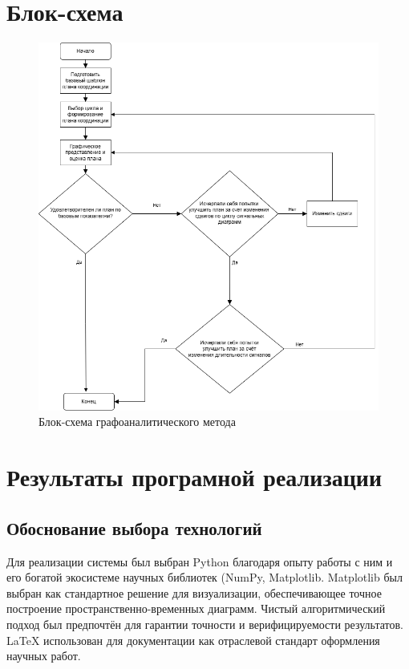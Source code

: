 \documentclass[12pt]{article}
\begin{document}
\section{Блок-схема}
\begin{figure}[h!]
  \centering
  \includegraphics[width=1.1\textwidth]{Block_diagram.png} 
  \caption{Блок-схема графоаналитического метода} 
  \label{fig:diagram} 
\end{figure}

\newpage

\section{Результаты програмной реализации}
\subsection{Обоснование выбора технологий}
Для реализации системы был выбран Python благодаря опыту работы с ним и его богатой экосистеме научных библиотек (NumPy, Matplotlib. Matplotlib был выбран как стандартное решение для визуализации, обеспечивающее точное построение пространственно-временных диаграмм. Чистый алгоритмический подход был предпочтён для гарантии точности и верифицируемости результатов. LaTeX использован для документации как отраслевой стандарт оформления научных работ.
\end{document}
